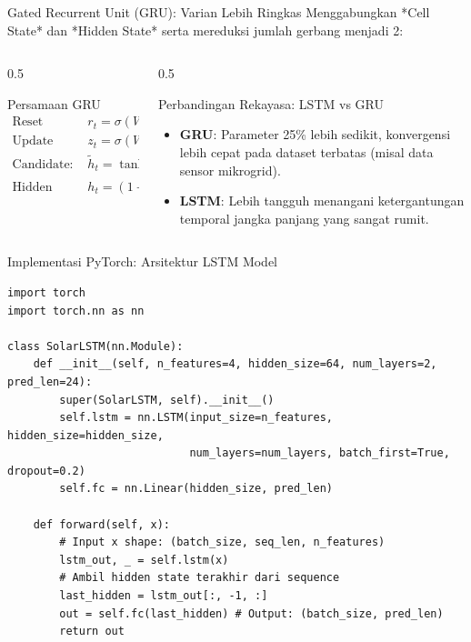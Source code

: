 \documentclass[aspectratio=169, 10pt]{beamer}
\begin{document}
\begin{frame}{Gated Recurrent Unit (GRU): Varian Lebih Ringkas}
    Menggabungkan *Cell State* dan *Hidden State* serta mereduksi jumlah gerbang menjadi 2:
    \begin{columns}[T]
        \begin{column}{0.5\textwidth}
            \begin{block}{Persamaan GRU}
                \begin{equation*}
                \begin{aligned}
                    \text{Reset Gate: } &r_t = \sigma(W_r [h_{t-1}, x_t]) \\
                    \text{Update Gate: } &z_t = \sigma(W_z [h_{t-1}, x_t]) \\
                    \text{Candidate: } &\tilde{h}_t = \tanh(W [r_t \odot h_{t-1}, x_t]) \\
                    \text{Hidden State: } &h_t = (1 - z_t) \odot h_{t-1} + z_t \odot \tilde{h}_t
                \end{aligned}
                \end{equation*}
            \end{block}
        \end{column}
        \begin{column}{0.5\textwidth}
            \begin{alertblock}{Perbandingan Rekayasa: LSTM vs GRU}
                \begin{itemize}
                    \item \textbf{GRU}: Parameter 25\% lebih sedikit, konvergensi lebih cepat pada dataset terbatas (misal data sensor mikrogrid).
                    \item \textbf{LSTM}: Lebih tangguh menangani ketergantungan temporal jangka panjang yang sangat rumit.
                \end{itemize}
            \end{alertblock}
        \end{column}
    \end{columns}
\end{frame}

\begin{frame}[fragile]{Implementasi PyTorch: Arsitektur LSTM Model}
\begin{lstlisting}
import torch
import torch.nn as nn

class SolarLSTM(nn.Module):
    def __init__(self, n_features=4, hidden_size=64, num_layers=2, pred_len=24):
        super(SolarLSTM, self).__init__()
        self.lstm = nn.LSTM(input_size=n_features, hidden_size=hidden_size,
                            num_layers=num_layers, batch_first=True, dropout=0.2)
        self.fc = nn.Linear(hidden_size, pred_len)

    def forward(self, x):
        # Input x shape: (batch_size, seq_len, n_features)
        lstm_out, _ = self.lstm(x)
        # Ambil hidden state terakhir dari sequence
        last_hidden = lstm_out[:, -1, :]
        out = self.fc(last_hidden) # Output: (batch_size, pred_len)
        return out
\end{lstlisting}
\end{frame}
\end{document}
